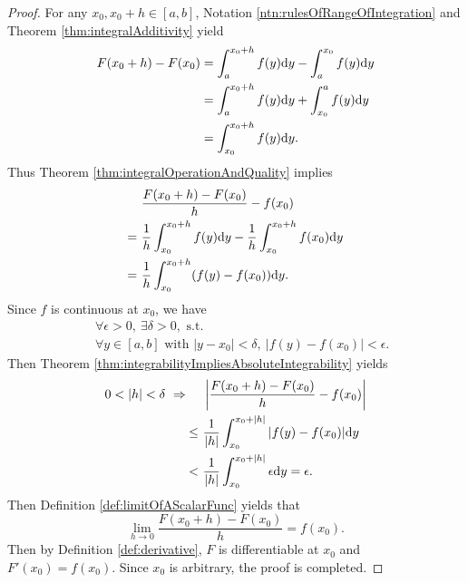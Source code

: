 \begin{proof}
  For any $x_{0},x_{0}+h\in [a,b]$,
  Notation \ref{ntn:rulesOfRangeOfIntegration} and Theorem
  \ref{thm:integralAdditivity} yield
  \begin{align*}
    F(x_{0}+h)-F(x_{0})
    &=\int_{a}^{x_{0}+h}f(y)\mathrm{d} y-\int_{a}^{x_{0}}f(y)\mathrm{d} y\\
    &=\int_{a}^{x_{0}+h}f(y)\mathrm{d} y+\int_{x_{0}}^{a}f(y)\mathrm{d} y\\
    &=\int_{x_{0}}^{x_{0}+h}f(y)\mathrm{d} y.
  \end{align*}
  Thus Theorem \ref{thm:integralOperationAndQuality} implies
  \begin{align*}
    &\ \frac{F(x_{0}+h)-F(x_{0})}{h}-f(x_{0})\\
    =&\ \frac{1}{h}\int_{x_{0}}^{x_{0}+h}f(y)\mathrm{d} y
      -\frac{1}{h}\int_{x_{0}}^{x_{0}+h}f(x_{0})\mathrm{d} y\\
    =&\ \frac{1}{h}\int_{x_{0}}^{{x_{0}+h}}(f(y)-f(x_{0}))\mathrm{d} y.
  \end{align*}
  Since $f$ is continuous at $x_{0}$, we have
  \begin{align*}
    &\ \forall \epsilon>0,\ \exists \delta>0,\text{ s.t. }\\
    &\ \forall y\in[a,b]\text{ with }|y-x_{0}|<\delta,\
      |f(y)-f(x_{0})|<\epsilon.
  \end{align*}
  Then Theorem \ref{thm:integrabilityImpliesAbsoluteIntegrability} yields
  \begin{align*}
    0<|h|<\delta\ \Rightarrow
    \quad &\ \left|\frac{F(x_{0}+h)-F(x_{0})}{h}-f(x_{0})\right|\\
    \le&\ \frac{1}{|h|}\int_{x_{0}}^{x_{0}+|h|}|f(y)-f(x_{0})|\dif y\\
    <&\ \frac{1}{|h|}\int_{x_{0}}^{x_{0}+|h|}\epsilon\dif y
    = \epsilon.
  \end{align*}
  Then Definition \ref{def:limitOfAScalarFunc} yields that
  \begin{displaymath}
    \lim_{h\rightarrow 0}\frac{F(x_{0}+h)-F(x_{0})}{h}=f(x_{0}).
  \end{displaymath}
  Then by Definition \ref{def:derivative},
  $F$ is differentiable at $x_{0}$ and $F'(x_{0})=f(x_{0})$.
  Since $x_{0}$ is arbitrary, the proof is completed.
\end{proof}

